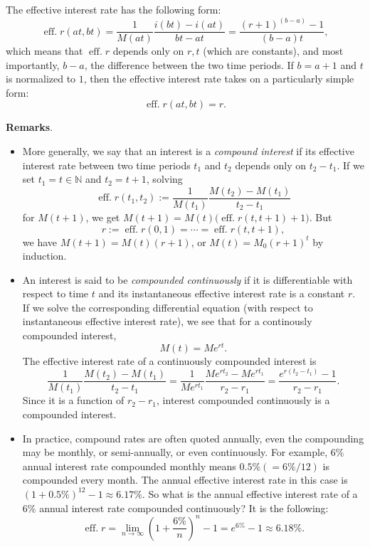 \documentclass[12pt]{article}
\begin{document}
The effective interest rate has the following form:
$$\operatorname{eff.}r(at,bt)=\frac{1}{M(at)}\frac{i(bt)-i(at)}{bt-at}=\frac{(r+1)^{(b-a)}-1}{(b-a)t},$$
which means that $\operatorname{eff.}r$ depends only on $r,t$ (which are constants), and most importantly, $b-a$, the difference between the two time periods.  If $b=a+1$ and $t$ is normalized to $1$, then the effective interest rate takes on a particularly simple form: $$\operatorname{eff.}r(at,bt)=r.$$



\textbf{Remarks}.  
\begin{itemize}
\item
More generally, we say that an interest is a \emph{compound interest} if its effective interest rate between two time periods $t_1$ and $t_2$ depends only on $t_2-t_1$.  If we set $t_1=t \in \mathbb{N}$ and $t_2=t+1$, solving  
$$\operatorname{eff.}r(t_1,t_2):=\frac{1}{M(t_1)} \frac{M(t_2)-M(t_1)}{t_2-t_1}$$
for $M(t+1)$, we get $M(t+1)=M(t)\big(\operatorname{eff.}r(t,t+1)+1\big)$.  But $$r:=\operatorname{eff.}r(0,1)=\cdots =\operatorname{eff.}r(t,t+1),$$ we have $M(t+1)=M(t)(r+1)$, or $M(t) = M_0(r+1)^t$ by induction.
\item
An interest is said to be \emph{compounded continuously} if it is differentiable with respect to time $t$ and its instantaneous effective interest rate is a constant $r$. If we solve the corresponding differential equation (with respect to instantaneous effective interest rate), we see that for a continously compounded interest, $$M(t)=Me^{rt}.$$
The effective interest rate of a continuously compounded interest is $$\frac{1}{M(t_1)}\frac{M(t_2)-M(t_1)}{t_2-t_1} =\frac{1}{Me^{rt_1}}\frac{Me^{rt_2}-Me^{rt_1}}{r_2-r_1} =\frac{e^{r(t_2-t_1)}-1}{r_2-r_1}.$$
Since it is a function of $r_2-r_1$, interest compounded continuously is a compounded interest.
\item 
In practice, compound rates are often quoted annually, even the compounding may be monthly, or semi-annually, or even continuously.  For example, $6\%$ annual interest rate compounded monthly means $0.5\% (=6\%/12)$ is compounded every month.  The annual effective interest rate in this case is $(1+0.5\%)^{12}-1\approx 6.17\%$.  So what is the annual effective interest rate of a $6\%$ annual interest rate compounded continuously?  It is the following:
$$\operatorname{eff.}r=\lim_{n\to \infty} (1+\frac{6\%}{n})^n-1=e^{6\%}-1\approx 6.18\%.$$
\end{itemize}
\end{document}
